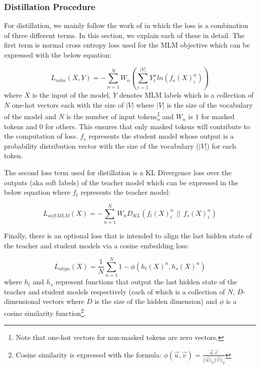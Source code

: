 \documentclass{article}
\begin{document}
\subsubsection{Distillation Procedure}
For distillation, we mainly follow the work of \citet{sanh2019distilbert} in which the loss is a combination of three different terms. In this section, we explain each of these in detail. The first term is normal cross entropy loss used for the MLM objective which can be expressed with the below equation:

\begin{equation} \label{eq:1}
    L_{mlm}(X , Y) = -\sum^{N}_{n=1}W_{n}(\sum^{|V|}_{i=1} Y^{n}_{i}ln(f_{s}(X)_{i}^{n}))
\end{equation}
where $X$ is the input of the model, $Y$ denotes MLM labels which is a collection of $N$ one-hot vectors each with the size of $|V|$ where $|V|$ is the size of the vocabulary of the model and $N$ is the number of input tokens\footnote{Note that one-hot vectors for non-masked tokens are zero vectors.} and $W_{n}$ is $1$ for masked tokens and $0$ for others. This ensures that only masked tokens will contribute to the computation of loss. $f_{s}$ represents the student model whose output is a probability distribution vector with the size of the vocabulary ($|V|$) for each token. 

The second loss term used for distillation is a KL Divergence loss over the outputs (aka soft labels) of the teacher model which can be expressed in the below equation where $f_{t}$ represents the teacher model:



\begin{equation} \label{eq:2}
    L_{softMLM}(X) = -\sum^{N}_{n=1}W_{n}D_{KL}(f_{t}(X )^{n}_{i} \hspace{5pt} || \hspace{5pt} f_{s}(X)_{i}^{n})
\end{equation}

Finally, there is an optional loss that is intended to align the last hidden state of the teacher and student models via a cosine embedding loss:

\begin{equation}  \label{eq:3}
    L_{align}(X) = \frac{1}{N} \sum^{N}_{n=1} 1 - \phi(h_{t}(X )^{n}, h_{s}(X)^{n})
\end{equation}
where $h_{t}$ and $h_{s}$ represent functions that output the last hidden state of the teacher and student models respectively (each of which is a collection of $N$, $D$-dimensional vectors where $D$ is the size of the hidden dimension) and $\phi$ is a cosine similarity function\footnote{Cosine similarity is expressed with the formula: $\phi(\Vec{u} , \Vec{v}) = \frac{\Vec{u}.\Vec{v}}{||\Vec{u}||_{2}||\Vec{v}||_{2}}$}.
\end{document}
